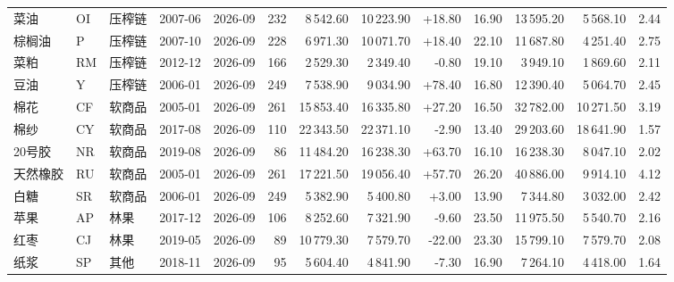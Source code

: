 \begin{table}[htbp]
\begin{adjustbox}{max width=\textwidth}
\begin{tabular}{@{}lllllrrrrrrrr@{}}
菜油 & OI & 压榨链 & 2007-06 & 2026-09 & 232 & 8\,542.60 & 10\,223.90 & +18.80 & 16.90 & 13\,595.20 & 5\,568.10 & 2.44 \\
棕榈油 & P & 压榨链 & 2007-10 & 2026-09 & 228 & 6\,971.30 & 10\,071.70 & +18.40 & 22.10 & 11\,687.80 & 4\,251.40 & 2.75 \\
菜粕 & RM & 压榨链 & 2012-12 & 2026-09 & 166 & 2\,529.30 & 2\,349.40 & -0.80 & 19.10 & 3\,949.10 & 1\,869.60 & 2.11 \\
豆油 & Y & 压榨链 & 2006-01 & 2026-09 & 249 & 7\,538.90 & 9\,034.90 & +78.40 & 16.80 & 12\,390.40 & 5\,064.70 & 2.45 \\
棉花 & CF & 软商品 & 2005-01 & 2026-09 & 261 & 15\,853.40 & 16\,335.80 & +27.20 & 16.50 & 32\,782.00 & 10\,271.50 & 3.19 \\
棉纱 & CY & 软商品 & 2017-08 & 2026-09 & 110 & 22\,343.50 & 22\,371.10 & -2.90 & 13.40 & 29\,203.60 & 18\,641.90 & 1.57 \\
20号胶 & NR & 软商品 & 2019-08 & 2026-09 & 86 & 11\,484.20 & 16\,238.30 & +63.70 & 16.10 & 16\,238.30 & 8\,047.10 & 2.02 \\
天然橡胶 & RU & 软商品 & 2005-01 & 2026-09 & 261 & 17\,221.50 & 19\,056.40 & +57.70 & 26.20 & 40\,886.00 & 9\,914.10 & 4.12 \\
白糖 & SR & 软商品 & 2006-01 & 2026-09 & 249 & 5\,382.90 & 5\,400.80 & +3.00 & 13.90 & 7\,344.80 & 3\,032.00 & 2.42 \\
苹果 & AP & 林果 & 2017-12 & 2026-09 & 106 & 8\,252.60 & 7\,321.90 & -9.60 & 23.50 & 11\,975.50 & 5\,540.70 & 2.16 \\
红枣 & CJ & 林果 & 2019-05 & 2026-09 & 89 & 10\,779.30 & 7\,579.70 & -22.00 & 23.30 & 15\,799.10 & 7\,579.70 & 2.08 \\
纸浆 & SP & 其他 & 2018-11 & 2026-09 & 95 & 5\,604.40 & 4\,841.90 & -7.30 & 16.90 & 7\,264.10 & 4\,418.00 & 1.64 \\
\bottomrule
\end{tabular}
\end{adjustbox}
\end{table}
